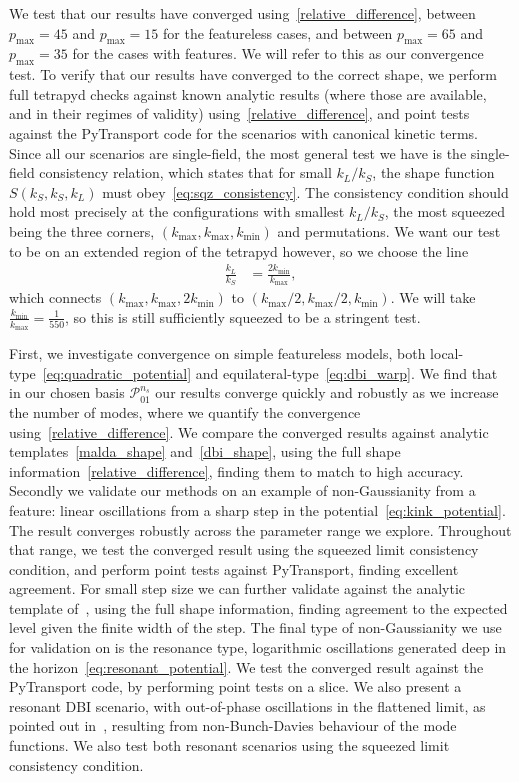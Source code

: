 \documentclass[a4paper,12pt]{extarticle}
\newcommand{\Pmax}{p_\text{max}}
\newcommand{\Lnsboth}{\mathcal{P}^{n_s}_{01}}
\newcommand{\kmin}{{k_\text{min}}}
\newcommand{\kmax}{{k_\text{max}}}
\begin{document}
We test that our results have converged using~\eqref{relative_difference},
between $\Pmax=45$ and $\Pmax=15$ for the featureless cases,
and between $\Pmax=65$ and $\Pmax=35$ for the cases with features.
We will refer to this as our convergence test.
To verify that our results have converged to the correct shape,
we perform full tetrapyd checks against known analytic results
(where those are available, and in their regimes of validity)
using~\eqref{relative_difference},
and point tests against the PyTransport code for the scenarios
with canonical kinetic terms.
Since all our scenarios are single-field, the most general
test we have is the single-field consistency relation,
which states that for small $k_L/k_S$, the shape function $S(k_S,k_S,k_L)$
must obey~\eqref{eq:sqz_consistency}.
The consistency condition should hold most precisely
at the configurations with smallest $k_L/k_S$,
the most squeezed being the three corners, $(\kmax,\kmax,\kmin)$ and permutations.
We want our test to be on an extended region of the tetrapyd however,
so we choose the line
\begin{align}\label{sqz_line}
    \frac{k_L}{k_S}&=\frac{2\kmin}{\kmax},
\end{align}
which connects $(\kmax,\kmax,2\kmin)$ to $(\kmax/2,\kmax/2,\kmin)$.
We will take $\frac{\kmin}{\kmax}=\frac{1}{550}$, so this is still sufficiently squeezed to be a stringent test.

First, we investigate convergence on simple featureless models,
both local-type~\eqref{eq:quadratic_potential}
and equilateral-type~\eqref{eq:dbi_warp}.
We find that in our chosen basis $\Lnsboth$ our results
converge quickly and robustly as we increase the number of modes,
where we quantify the convergence using~\eqref{relative_difference}.
We compare the converged results against analytic
templates~\eqref{malda_shape} and~\eqref{dbi_shape},
using the full shape information~\eqref{relative_difference},
finding them to match to high accuracy.
Secondly we validate our methods on an example of non-Gaussianity
from a feature: linear oscillations from a sharp step in the
potential~\eqref{eq:kink_potential}. The result converges robustly
across the parameter range we explore. Throughout that range,
we test the converged result using the squeezed limit consistency
condition, and perform point tests against PyTransport,
finding excellent agreement.
For small step size we can further validate against the analytic template
of~\cite{adshead}, using the full shape information, finding agreement
to the expected level given the finite width of the step.
The final type of non-Gaussianity we use for validation on is the resonance
type, logarithmic oscillations generated deep in the horizon~\eqref{eq:resonant_potential}.
We test the converged result against the PyTransport
code, by performing point tests on a slice.
We also present a resonant DBI scenario, with out-of-phase oscillations
in the flattened limit, as pointed out in~\cite{chen_folded_resonant},
resulting from non-Bunch-Davies behaviour of the mode functions.
We also test both resonant scenarios using the squeezed limit consistency condition.
\end{document}
